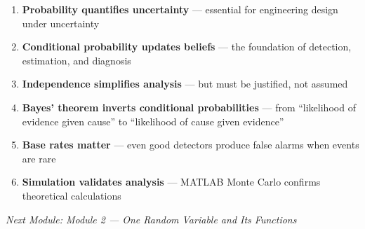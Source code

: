 
\begin{enumerate}
\def\labelenumi{\arabic{enumi}.}
\tightlist
\item
  \textbf{Probability quantifies uncertainty} — essential for engineering design under uncertainty
\item
  \textbf{Conditional probability updates beliefs} — the foundation of detection, estimation, and diagnosis
\item
  \textbf{Independence simplifies analysis} — but must be justified, not assumed
\item
  \textbf{Bayes’ theorem inverts conditional probabilities} — from ``likelihood of evidence given cause'' to ``likelihood of cause given evidence''
\item
  \textbf{Base rates matter} — even good detectors produce false alarms when events are rare
\item
  \textbf{Simulation validates analysis} — MATLAB Monte Carlo confirms theoretical calculations
\end{enumerate}

\emph{Next Module: {Module 2 — One Random Variable and Its Functions}}
